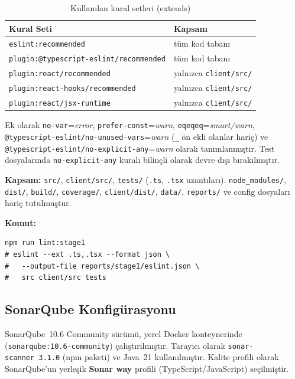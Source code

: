 \documentclass[conference]{IEEEtran}
\begin{document}
\begin{table}[htbp]
\caption{Kullanılan kural setleri (extends)}
\label{tab:eslint-rules}
\centering
\begin{tabular}{@{}ll@{}}
\toprule
\textbf{Kural Seti} & \textbf{Kapsam} \\
\midrule
\texttt{eslint:recommended} & tüm kod tabanı \\
\texttt{plugin:@typescript-eslint/recommended} & tüm kod tabanı \\
\texttt{plugin:react/recommended} & yalnızca \texttt{client/src/} \\
\texttt{plugin:react-hooks/recommended} & yalnızca \texttt{client/src/} \\
\texttt{plugin:react/jsx-runtime} & yalnızca \texttt{client/src/} \\
\bottomrule
\end{tabular}
\end{table}

Ek olarak \texttt{no-var}=\textit{error},
\texttt{prefer-const}=\textit{warn},
\texttt{eqeqeq}=\textit{smart/warn},
\texttt{@typescript-eslint/no-unused-vars}=\textit{warn}
(\texttt{\_} ön ekli olanlar hariç) ve
\texttt{@typescript-eslint/no-explicit-any}=\textit{warn} olarak
tanımlanmıştır. Test dosyalarında \texttt{no-explicit-any} kuralı
bilinçli olarak devre dışı bırakılmıştır.

\textbf{Kapsam:} \texttt{src/}, \texttt{client/src/}, \texttt{tests/}
(\texttt{.ts}, \texttt{.tsx} uzantıları). \texttt{node\_modules/},
\texttt{dist/}, \texttt{build/}, \texttt{coverage/}, \texttt{client/dist/},
\texttt{data/}, \texttt{reports/} ve config dosyaları hariç tutulmuştur.

\textbf{Komut:}
\begin{small}
\begin{verbatim}
npm run lint:stage1
# eslint --ext .ts,.tsx --format json \
#   --output-file reports/stage1/eslint.json \
#   src client/src tests
\end{verbatim}
\end{small}

\subsection{SonarQube Konfigürasyonu}

SonarQube~10.6 Community sürümü, yerel Docker konteynerinde
(\texttt{sonarqube:10.6-community}) çalıştırılmıştır. Tarayıcı olarak
\texttt{sonar-scanner~3.1.0} (npm paketi) ve Java~21 kullanılmıştır.
Kalite profili olarak SonarQube'un yerleşik \textbf{Sonar way} profili
(TypeScript/JavaScript) seçilmiştir.
\end{document}

